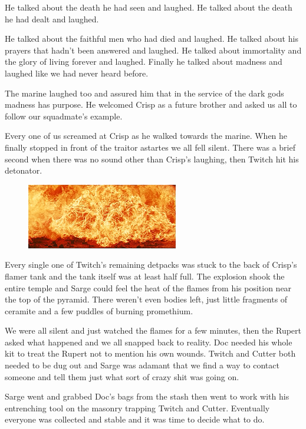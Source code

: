 He talked about the death he had seen and laughed. 
He talked about the death he had dealt and laughed.

He talked about the faithful men who had died and laughed. 
He talked about his prayers that hadn't been answered and laughed. 
He talked about immortality and the glory of living forever and laughed. 
Finally he talked about madness and laughed like we had never heard before.

The marine laughed too and assured him that in the service of the dark gods madness has purpose. 
He welcomed Crisp as a future brother and asked us all to follow our squadmate's example.

Every one of us screamed at Crisp as he walked towards the marine. When he finally stopped in front of the traitor astartes we all fell silent. 
There was a brief second when there was no sound other than Crisp's laughing, then Twitch hit his detonator.

\begin{figure}
	\begin{center}
		\includegraphics[width=\figwidth]{pics/6/50.png}
	\end{center}
\end{figure}
Every single one of Twitch's remaining detpacks was stuck to the back of Crisp's flamer tank and the tank itself was at least half full. 
The explosion shook the entire temple and Sarge could feel the heat of the flames from his position near the top of the pyramid. 
There weren't even bodies left, just little fragments of ceramite and a few puddles of burning promethium.

We were all silent and just watched the flames for a few minutes, then the Rupert asked what happened and we all snapped back to reality. 
Doc needed his whole kit to treat the Rupert not to mention his own wounds. 
Twitch and Cutter both needed to be dug out and Sarge was adamant that we find a way to contact someone and tell them just what sort of crazy shit was going on.

Sarge went and grabbed Doc's bags from the stash then went to work with his entrenching tool on the masonry trapping Twitch and Cutter. 
Eventually everyone was collected and stable and it was time to decide what to do.

